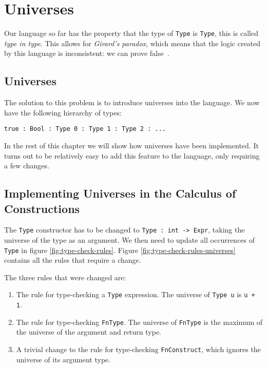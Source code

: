\chapter{Universes}
\label{ch:universes}

Our language so far has the property that the type of \verb|Type| is \verb|Type|, this is called \emph{type in type}. This allows for \emph{Girard's paradox}, which means that the logic created by this language is inconsistent: we can prove false~\cite{girard}. 

\section{Universes}

The solution to this problem is to introduce universes into the language. We now have the following hierarchy of types:
\begin{lstlisting}
true : Bool : Type 0 : Type 1 : Type 2 : ...
\end{lstlisting}

In the rest of this chapter we will show how universes have been implemented. It turns out to be relatively easy to add this feature to the language, only requiring a few changes.

\section{Implementing Universes in the Calculus of Constructions}

The \verb|Type| constructor has to be changed to \verb|Type : int -> Expr|, taking the universe of the type as an argument. We then need to update all occurrences of \verb|Type| in figure \ref{fig:type-check-rules}. Figure \ref{fig:type-check-rules-universes} contains all the rules that require a change.

The three rules that were changed are:
\begin{enumerate}
	\item The rule for type-checking a \verb|Type| expression. The universe of \verb|Type u| is \verb|u + 1|. 
	\item The rule for type-checking \verb|FnType|. The universe of \verb|FnType| is the maximum of the universe of the argument and return type.
	\item A trivial change to the rule for type-checking \verb|FnConstruct|, which ignores the universe of its argument type.
\end{enumerate}

